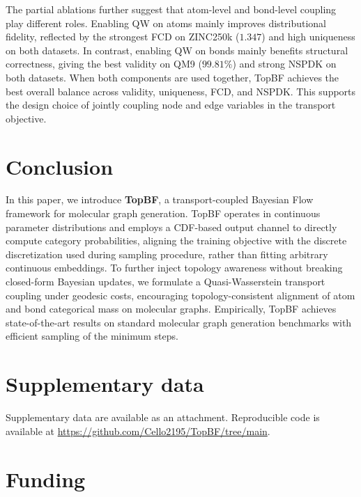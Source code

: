 \documentclass[journal,twoside,web]{ieeecolor}
\begin{document}
The partial ablations further suggest that atom-level and bond-level coupling play different roles. Enabling QW on atoms mainly improves distributional fidelity, reflected by the strongest FCD on ZINC250k ($1.347$) and high uniqueness on both datasets. In contrast, enabling QW on bonds mainly benefits structural correctness, giving the best validity on QM9 ($99.81\%$) and strong NSPDK on both datasets. When both components are used together, TopBF achieves the best overall balance across validity, uniqueness, FCD, and NSPDK. This supports the design choice of jointly coupling node and edge variables in the transport objective.


\section{Conclusion}
\label{sec:conclusion}

In this paper, we introduce \textbf{TopBF}, a transport-coupled Bayesian Flow framework for molecular graph generation. TopBF operates in continuous parameter distributions and employs a CDF-based output channel to directly compute category probabilities, aligning the training objective with the discrete discretization used during sampling procedure, rather than fitting arbitrary continuous embeddings. To further inject topology awareness without breaking closed-form Bayesian updates, we formulate a Quasi-Wasserstein transport coupling under geodesic costs, encouraging topology-consistent alignment of atom and bond categorical mass on molecular graphs. Empirically, TopBF achieves state-of-the-art results on standard molecular graph generation benchmarks with efficient sampling of the minimum steps.


\section*{Supplementary data}

Supplementary data are available as an attachment. Reproducible code is available at \url{https://github.com/Cello2195/TopBF/tree/main}.




\section*{Funding}
\end{document}

